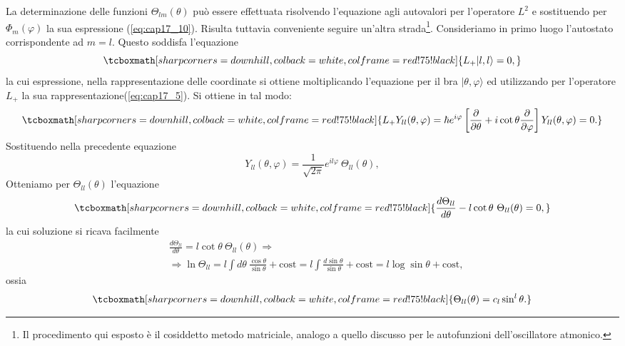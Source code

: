 La determinazione delle funzioni $\Theta _{lm} (\theta)$ può essere effettuata risolvendo l'equazione agli autovalori per l'operatore $L^2$ e sostituendo per $\Phi _m (\varphi)$ la sua espressione (\ref{eq:cap17_10}). Risulta tuttavia conveniente seguire un'altra strada\footnote{Il procedimento qui esposto è il cosiddetto metodo matriciale, analogo a quello discusso per le autofunzioni dell'oscillatore atmonico.}. Consideriamo in primo luogo l'autostato corrispondente ad $m=l$. Questo soddisfa l'equazione
	\begin{equation}
		\tcboxmath[sharp corners=downhill, colback=white, colframe=red!75!black]{
			L_+ \vert l,l\rangle =0,
			}
	\end{equation}
la cui espressione, nella rappresentazione delle coordinate si ottiene moltiplicando l'equazione per il bra $\vert \theta, \varphi \rangle$ ed utilizzando per  l'operatore $L_+$ la sua rappresentazione(\ref{eq:cap17_5}). Si ottiene in tal modo:
	\begin{equation}
		\tcboxmath[sharp corners=downhill, colback=white, colframe=red!75!black]{
			L_+Y_{ll}(\theta , \varphi ) = \hbar e^{i\varphi}\left[\frac{\partial}{\partial\theta}+i \cot\theta \frac{\partial}{\partial \varphi}\right]Y_{ll}(\theta , \varphi ) =0 .
			}
	\end{equation}
Sostituendo nella precedente equazione 
	\begin{equation}
		Y_{ll}(\theta , \varphi ) = \frac{1}{\sqrt{2\pi}}e^{il\varphi}\ \Theta _{ll} (\theta ) ,
	\end{equation}
Otteniamo per $\Theta _{ll} (\theta )$ l'equazione
	\begin{equation}
		\tcboxmath[sharp corners=downhill, colback=white, colframe=red!75!black]{
			\frac{d\Theta _{ll}}{d \theta}-l\cot\theta \ \Theta _{ll} (\theta )=0 ,
			}
	\end{equation}
la cui soluzione si ricava facilmente
	\begin{align}
	& \frac{d\Theta _{ll}}{d \theta}=l\cot\theta \ \Theta _{ll} (\theta ) \Rightarrow \nonumber \\
	& \Rightarrow \ln \Theta _{ll} = l \int d\theta \ \frac{\cos \theta}{\sin \theta}+ \textrm{cost} = l \int  \frac{d\sin \theta}{\sin \theta}+ \textrm{cost} = l \log \sin \theta + \textrm{cost} ,
	\end{align}
ossia
	\begin{equation}
		\tcboxmath[sharp corners=downhill, colback=white, colframe=red!75!black]{
			\Theta _{ll} (\theta )= c_l \sin ^l \theta .
			}
	\end{equation}
